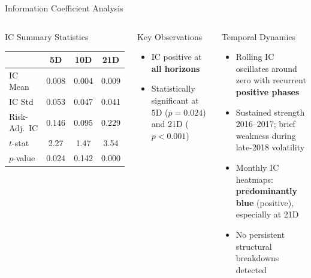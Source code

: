 \documentclass[aspectratio=169, 11pt]{beamer}
\begin{document}
%
%
\begin{frame}{Information Coefficient Analysis}

\begin{columns}[T]
\begin{block}{IC Summary Statistics}
\centering\small
\begin{tabular}{lccc}
\toprule
& 5D & 10D & 21D \\
\midrule
IC Mean & 0.008 & 0.004 & 0.009 \\
IC Std & 0.053 & 0.047 & 0.041 \\
Risk-Adj.\ IC & 0.146 & 0.095 & 0.229 \\
$t$-stat & 2.27 & 1.47 & 3.54 \\
$p$-value & 0.024 & 0.142 & 0.000 \\
\bottomrule
\end{tabular}
\end{block}

\vspace{-0.3cm}

\begin{block}{Key Observations}
\begin{itemize}
  \item IC positive at \textbf{all horizons}
  \item Statistically significant at 5D ($p{=}0.024$) and 21D ($p{<}0.001$)
\end{itemize}
\end{block}

\begin{block}{Temporal Dynamics}
\begin{itemize}
  \item Rolling IC oscillates around zero with recurrent \textbf{positive phases}
  \item Sustained strength 2016--2017; brief weakness during late-2018 volatility
  \item Monthly IC heatmaps: \textbf{predominantly blue} (positive), especially at 21D
  \item No persistent structural breakdowns detected
\end{itemize}
\end{block}
\end{columns}
\end{frame}
\end{document}
